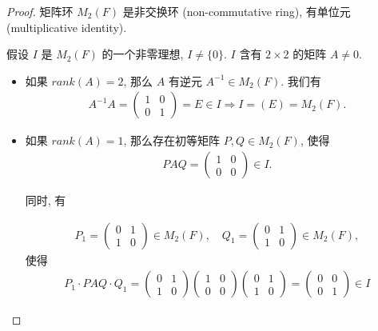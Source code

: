 \documentclass[utf8]{ctexbook}
\theoremstyle{definition}
\begin{document}
\begin{proof}
矩阵环 $M_{2} (F)$ 是非交换环 (non-commutative ring), 有单位元 (multiplicative identity).

假设 $I$ 是 $M_{2} (F)$ 的一个非零理想, $I \neq \{ 0 \}$. $I$ 含有 $2 \times 2$ 的矩阵 $A \neq 0$.
\begin{itemize}
\item{如果 $rank(A) = 2$, 那么 $A$ 有逆元 $A^{-1} \in M_{2} (F)$. 我们有
\begin{align*}
A^{-1} A = \left(
\begin{array}{cc}
1 & 0 \\
0 & 1
\end{array}
\right)
= E \in I \Longrightarrow I = (E) = M_{2} (F) .
\end{align*}
}
\item{如果 $rank(A)=1$, 那么存在初等矩阵 $P, Q \in M_{2} (F)$, 使得
\begin{align*}
P A Q = \left(
\begin{array}{cc}
1 & 0 \\
0 & 0
\end{array}
\right)
\in I .
\end{align*}

同时, 有

\begin{align*}
P_1 = \left(
\begin{array}{cc}
0 & 1 \\
1 & 0
\end{array}
\right) \in M_{2} (F),
\quad
Q_1 = 
\left(
\begin{array}{cc}
0 & 1 \\
1 & 0
\end{array}
\right) \in M_{2} (F),
\end{align*}
使得
\begin{align*}
P_1 \cdot PAQ \cdot Q_1 = 
\left(
\begin{array}{cc}
0 & 1 \\
1 & 0
\end{array}
\right) 
\left(
\begin{array}{cc}
1 & 0 \\
0 & 0
\end{array}
\right)
\left(
\begin{array}{cc}
0 & 1 \\
1 & 0
\end{array}
\right) = 
\left(
\begin{array}{cc}
0 & 0 \\
0 & 1
\end{array}
\right) \in I
\end{align*}

}
\end{itemize}
\end{proof}
\end{document}
